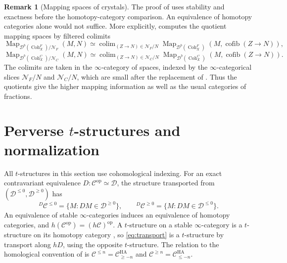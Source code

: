 \documentclass[11pt]{amsart}
\newcommand{\cC}{\mathcal{C}}
\newcommand{\cD}{\mathcal{D}}
\newcommand{\cN}{\mathcal{N}}
\newcommand{\Map}{\operatorname{Map}}
\newcommand{\op}{{\operatorname{op}}}
\newcommand{\Coh}{\operatorname{{Coh}}}
\newcommand{\cofib}{\operatorname{cofib}}
\newcommand{\Db}{\mathcal D^b}
\theoremstyle{plain}
\theoremstyle{definition}
\newtheorem{remark}[remark]{Remark}
\numberwithin{equation}{section}
\begin{document}
\begin{remark}[Mapping spaces of crystals]\label{rem:crystal-maps}
The proof of  uses stability and exactness before the homotopy-category comparison.
An equivalence of homotopy categories alone would not suffice.
More explicitly, \cite[Theorem I.3.3(ii)]{NS} computes the quotient mapping spaces by filtered colimits
\[
 \Map_{\Db(\Coh^F_X)/\cN_F}(M,N)
 \simeq\mathop{\operatorname{colim}}_{(Z\to N)\in\cN_F/N}
            \Map_{\Db(\Coh^F_X)}(M,\cofib(Z\to N)),
\]
\[
 \Map_{\Db(\Coh^C_X)/\cN_C}(M,N)
 \simeq\mathop{\operatorname{colim}}_{(Z\to N)\in\cN_C/N}
            \Map_{\Db(\Coh^C_X)}(M,\cofib(Z\to N)).
\]
The colimits are taken in the $\infty$-category of spaces, indexed by the $\infty$-categorical slices $\cN_F/N$ and $\cN_C/N$, which are small after the replacement of .
Thus the quotients give the higher mapping information as well as the usual categories of fractions.
\end{remark}

\section{Perverse \texorpdfstring{$t$}{t}-structures and normalization}\label{sec:perverse}
All $t$-structures in this section use cohomological indexing.
For an exact contravariant equivalence $D:\cC^{\op}\simeq\cD$, the structure transported from $(\cD^{\leq0},\cD^{\geq0})$ has
\begin{equation}\label{eq:transport}
 {}^D\cC^{\leq0}=\{M:DM\in\cD^{\geq0}\},\qquad
 {}^D\cC^{\geq0}=\{M:DM\in\cD^{\leq0}\}.
\end{equation}
An equivalence of stable $\infty$-categories induces an equivalence of homotopy categories, and $h(\cC^{\op})=(h\cC)^{\op}$.
A $t$-structure on a stable $\infty$-category is a $t$-structure on its homotopy category \cite[Definition 1.2.1.4]{HA}, so \eqref{eq:transport} is a $t$-structure by transport along $hD$, using the opposite $t$-structure.
The relation to the homological convention of \cite[Warning 1.2.1.13]{HA} is
$\cC^{\leq n}=\cC^{\mathrm{HA}}_{\geq -n}$ and
$\cC^{\geq n}=\cC^{\mathrm{HA}}_{\leq -n}$.
\end{document}
